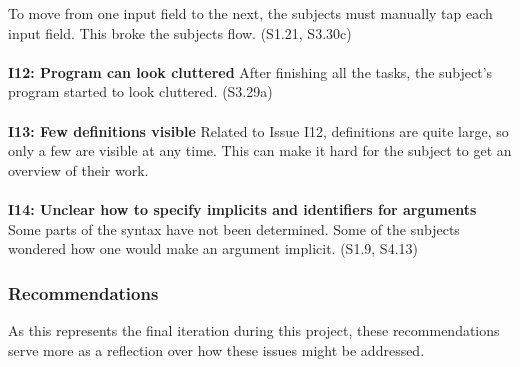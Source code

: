 To move from one input field to the next, the subjects must manually tap each
input field. This broke the subjects flow. (S1.21, S3.30c)
\\ \\
\textbf{I12: Program can look cluttered}
After finishing all the tasks, the subject's program started to look cluttered.
 (S3.29a)
\\ \\
\textbf{I13: Few definitions visible}
Related to Issue I12, definitions are quite large, so only a few are visible at
any time. This can make it hard for the subject to get an overview of their
work.
\\ \\
\textbf{I14: Unclear how to specify implicits and identifiers for arguments}
Some parts of the syntax have not been determined. Some of the subjects
wondered how one would make an argument implicit. (S1.9, S4.13)

\subsubsection{Recommendations}
\label{sec:second_recommendations}
As this represents the final iteration during this project, these
recommendations serve more as a reflection over how these issues might be
addressed.

